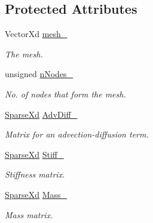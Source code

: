 \subsection*{Protected Attributes}
\begin{DoxyCompactItemize}
\item 
\hypertarget{classPdeSolver1D_ac0185cf9f8cdf64273950a48d63df3f7}{Vector\-Xd \hyperlink{classPdeSolver1D_ac0185cf9f8cdf64273950a48d63df3f7}{mesh\-\_\-}}\label{classPdeSolver1D_ac0185cf9f8cdf64273950a48d63df3f7}

\begin{DoxyCompactList}\small\item\em The mesh. \end{DoxyCompactList}\item 
\hypertarget{classPdeSolver1D_a8f4bb43717322579edc12974700aec98}{unsigned \hyperlink{classPdeSolver1D_a8f4bb43717322579edc12974700aec98}{n\-Nodes\-\_\-}}\label{classPdeSolver1D_a8f4bb43717322579edc12974700aec98}

\begin{DoxyCompactList}\small\item\em No. of nodes that form the mesh. \end{DoxyCompactList}\item 
\hypertarget{classPdeSolver1D_a2febd884c8758db9fd346a40d81671eb}{\hyperlink{typedefs_8h_a86edf437f454f4dd79d5422366403b7f}{Sparse\-Xd} \hyperlink{classPdeSolver1D_a2febd884c8758db9fd346a40d81671eb}{Adv\-Diff\-\_\-}}\label{classPdeSolver1D_a2febd884c8758db9fd346a40d81671eb}

\begin{DoxyCompactList}\small\item\em Matrix for an advection-\/diffusion term. \end{DoxyCompactList}\item 
\hypertarget{classPdeSolver1D_a63de5de1757c8bc5cd0941030f9794e3}{\hyperlink{typedefs_8h_a86edf437f454f4dd79d5422366403b7f}{Sparse\-Xd} \hyperlink{classPdeSolver1D_a63de5de1757c8bc5cd0941030f9794e3}{Stiff\-\_\-}}\label{classPdeSolver1D_a63de5de1757c8bc5cd0941030f9794e3}

\begin{DoxyCompactList}\small\item\em Stiffness matrix. \end{DoxyCompactList}\item 
\hypertarget{classPdeSolver1D_aa0e70aa868721f4bbf1fe7ec57e097a9}{\hyperlink{typedefs_8h_a86edf437f454f4dd79d5422366403b7f}{Sparse\-Xd} \hyperlink{classPdeSolver1D_aa0e70aa868721f4bbf1fe7ec57e097a9}{Mass\-\_\-}}\label{classPdeSolver1D_aa0e70aa868721f4bbf1fe7ec57e097a9}

\begin{DoxyCompactList}\small\item\em Mass matrix. \end{DoxyCompactList}\end{DoxyCompactItemize}
